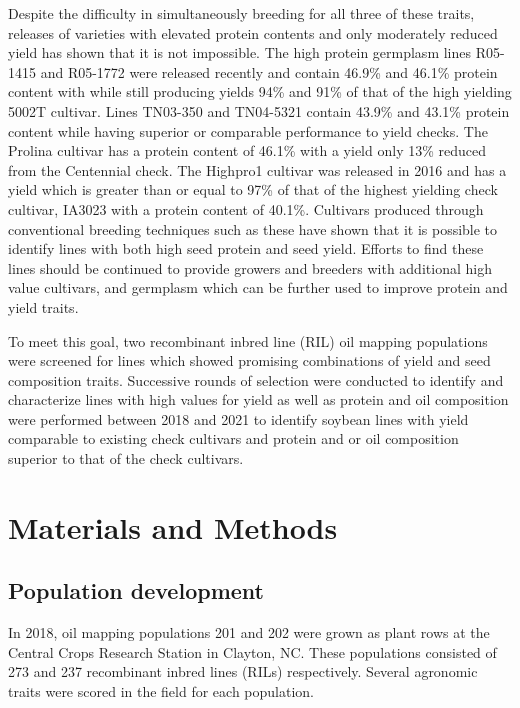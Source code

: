 \documentclass[Agronomy,article,submit,moreauthors,pdftex]{mdpi}
\begin{document}
Despite the difficulty in simultaneously breeding for all three of these
traits, releases of varieties with elevated protein contents and only
moderately reduced yield has shown that it is not impossible. The high
protein germplasm lines R05-1415 and R05-1772 were released recently and
contain 46.9\% and 46.1\% protein content with while still producing
yields 94\% and 91\% of that of the high yielding 5002T
cultivar\citep{HiProtHiYield02}. Lines TN03-350 and TN04-5321 contain
43.9\% and 43.1\% protein content while having superior or comparable
performance to yield checks\citep{HiProtHiYield04}. The Prolina cultivar
has a protein content of 46.1\% with a yield only 13\% reduced from the
Centennial check\citep{HiProtHiYield01}. The Highpro1 cultivar was
released in 2016 and has a yield which is greater than or equal to 97\%
of that of the highest yielding check cultivar, IA3023 with a protein
content of 40.1\%\citep{HighPro1}. Cultivars produced through
conventional breeding techniques such as these have shown that it is
possible to identify lines with both high seed protein and seed yield.
Efforts to find these lines should be continued to provide growers and
breeders with additional high value cultivars, and germplasm which can
be further used to improve protein and yield traits.

To meet this goal, two recombinant inbred line (RIL) oil mapping
populations were screened for lines which showed promising combinations
of yield and seed composition traits. Successive rounds of selection
were conducted to identify and characterize lines with high values for
yield as well as protein and oil composition were performed between 2018
and 2021 to identify soybean lines with yield comparable to existing
check cultivars and protein and or oil composition superior to that of
the check cultivars.

\hypertarget{materials-and-methods}{%
\section{Materials and Methods}\label{materials-and-methods}}

\hypertarget{population-development}{%
\subsection{Population development}\label{population-development}}

In 2018, oil mapping populations 201 and 202 were grown as plant rows at
the Central Crops Research Station in Clayton, NC. These populations
consisted of 273 and 237 recombinant inbred lines (RILs) respectively.
Several agronomic traits were scored in the field for each population.
\end{document}
